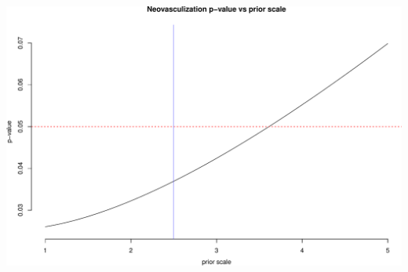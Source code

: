 \documentclass[
  ignorenonframetext,
]{beamer}
\begin{document}
\begin{frame}{}
\protect\hypertarget{section-30}{}
\includegraphics{week7_p2_files/figure-beamer/plot-1.pdf}
\end{frame}
\end{document}
